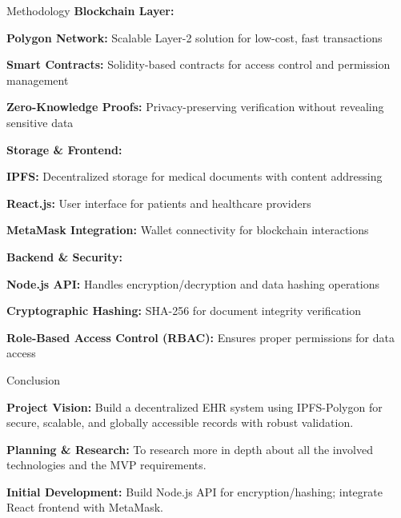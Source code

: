 \documentclass[10pt]{beamer}
\let\olditemize\itemize
\let\endolditemize\enditemize
\renewenvironment{itemize}
  {\olditemize\justifying}
  {\endolditemize}
\begin{document}
\begin{frame}{Methodology}
\textbf{Blockchain Layer:}
\begin{itemize}
\item \textbf{Polygon Network:} Scalable Layer-2 solution for low-cost, fast transactions
\item \textbf{Smart Contracts:} Solidity-based contracts for access control and permission management
\item \textbf{Zero-Knowledge Proofs:} Privacy-preserving verification without revealing sensitive data
\end{itemize}

\vspace{0.3cm}

\textbf{Storage \& Frontend:}
\begin{itemize}
\item \textbf{IPFS:} Decentralized storage for medical documents with content addressing
\item \textbf{React.js:} User interface for patients and healthcare providers
\item \textbf{MetaMask Integration:} Wallet connectivity for blockchain interactions
\end{itemize}

\vspace{0.3cm}

\textbf{Backend \& Security:}
\begin{itemize}
\item \textbf{Node.js API:} Handles encryption/decryption and data hashing operations
\item \textbf{Cryptographic Hashing:} SHA-256 for document integrity verification
\item \textbf{Role-Based Access Control (RBAC):} Ensures proper permissions for data access
\end{itemize}
\end{frame}

\begin{frame}{Conclusion}
\begin{itemize}
\item \textbf{Project Vision:} Build a decentralized EHR system using IPFS-Polygon for secure, scalable, and globally accessible records with robust validation.

\item \textbf{Planning \& Research:} To research more in depth about all the involved technologies and the MVP requirements.

\item \textbf{Initial Development:} Build Node.js API for encryption/hashing; integrate React frontend with MetaMask.
\end{itemize}
\end{frame}
\end{document}
